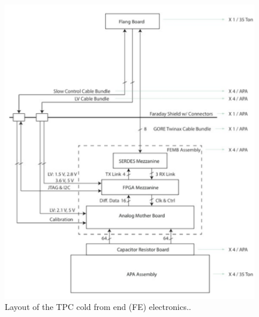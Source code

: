 




\begin{figure}[htb]
\centering
\begin{minipage}[b]{1.0\textwidth}
\begin{center}
\includegraphics[width=.75\textwidth]{figures/fe-electronics-block-diagram.pdf}
\end{center}
\end{minipage}
\caption{Layout of the TPC cold from end (FE) electronics..}
\label{fig:coldelec}
\end{figure}



